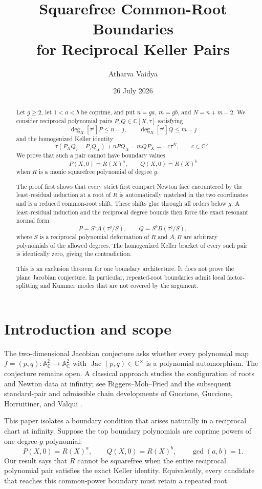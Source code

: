 \documentclass[11pt]{article}
\title{Squarefree Common-Root Boundaries\\
for Reciprocal Keller Pairs}
\author{Atharva Vaidya}
\date{26 July 2026}
\theoremstyle{definition}
\theoremstyle{remark}
\newcommand{\C}{\mathbb C}
\newcommand{\A}{\mathbb A}
\newcommand{\Jac}{\operatorname{Jac}}
\begin{document}
\maketitle

\begin{abstract}
Let \(g\geq2\), let \(1<a<b\) be coprime, and put
\(n=ga\), \(m=gb\), and \(N=n+m-2\).
We consider reciprocal polynomial pairs \(P,Q\in\C[X,\tau]\) satisfying
\[
 \deg_X[\tau^j]P\leq n-j,\qquad
 \deg_X[\tau^j]Q\leq m-j
\]
and the homogenized Keller identity
\[
 \tau(P_XQ_\tau-P_\tau Q_X)+nPQ_X-mQP_X
 =-c\tau^N,\qquad c\in\C^\times.
\]
We prove that such a pair cannot have boundary values
\[
 P(X,0)=R(X)^a,\qquad Q(X,0)=R(X)^b
\]
when \(R\) is a monic squarefree polynomial of degree \(g\).

The proof first shows that every strict first compact Newton face
encountered by the least-residual induction at a root of \(R\) is
automatically matched in the two coordinates and is a reduced common-root
shift.  These shifts glue through all orders below \(g\).
A least-residual induction and the reciprocal degree bounds then force
the exact resonant normal form
\[
 P=S^aA(\tau^g/S),\qquad Q=S^bB(\tau^g/S),
\]
where \(S\) is a reciprocal polynomial deformation of \(R\) and \(A,B\)
are arbitrary polynomials of the allowed degrees.  The homogenized
Keller bracket of every such pair is identically zero, giving the
contradiction.

This is an exclusion theorem for one boundary architecture.  It does
not prove the plane Jacobian conjecture.  In particular, repeated-root
boundaries admit local factor-splitting and Kummer modes that are not
covered by the argument.
\end{abstract}

\section{Introduction and scope}

The two-dimensional Jacobian conjecture asks whether every polynomial
map \(f=(p,q):\A^2_\C\to\A^2_\C\) with
\(\Jac(p,q)\in\C^\times\) is a polynomial automorphism.  The conjecture
remains open.  A classical approach studies the configuration of roots
and Newton data at infinity; see Biggers--Moh--Fried
\cite{BiggersMohFried} and the subsequent standard-pair and admissible
chain developments of Guccione, Guccione, Horruitiner, and Valqui
\cite{GGVSystem,GGVLowerSide,GGHVAlgorithms,GGHV2022}.

This paper isolates a boundary condition that arises naturally in a
reciprocal chart at infinity.  Suppose the top boundary polynomials are
coprime powers of one degree-\(g\) polynomial:
\[
 P(X,0)=R(X)^a,\qquad Q(X,0)=R(X)^b,
 \qquad \gcd(a,b)=1.
\]
Our result says that \(R\) cannot be squarefree when the entire
reciprocal polynomial pair satisfies the exact Keller identity.
Equivalently, every candidate that reaches this common-power boundary
must retain a repeated root.
\end{document}
